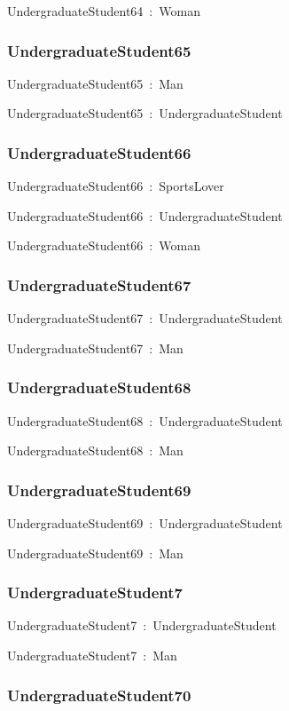 \documentclass{article}
\begin{document}
UndergraduateStudent64~:~Woman

\subsubsection*{UndergraduateStudent65}

UndergraduateStudent65~:~Man

UndergraduateStudent65~:~UndergraduateStudent

\subsubsection*{UndergraduateStudent66}

UndergraduateStudent66~:~SportsLover

UndergraduateStudent66~:~UndergraduateStudent

UndergraduateStudent66~:~Woman

\subsubsection*{UndergraduateStudent67}

UndergraduateStudent67~:~UndergraduateStudent

UndergraduateStudent67~:~Man

\subsubsection*{UndergraduateStudent68}

UndergraduateStudent68~:~UndergraduateStudent

UndergraduateStudent68~:~Man

\subsubsection*{UndergraduateStudent69}

UndergraduateStudent69~:~UndergraduateStudent

UndergraduateStudent69~:~Man

\subsubsection*{UndergraduateStudent7}

UndergraduateStudent7~:~UndergraduateStudent

UndergraduateStudent7~:~Man

\subsubsection*{UndergraduateStudent70}
\end{document}

